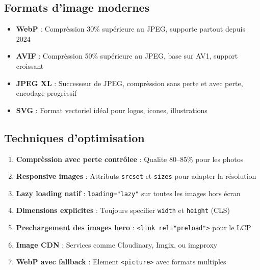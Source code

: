\subsection{Formats d'image modernes}

\begin{itemize}
    \item \textbf{WebP} : Comprèssion 30\% supérieure au JPEG, supporte partout depuis 2024
    \item \textbf{AVIF} : Comprèssion 50\% supérieure au JPEG, base sur AV1, support croissant
    \item \textbf{JPEG XL} : Successeur de JPEG, comprèssion sans perte et avec perte, encodage progrèssif
    \item \textbf{SVG} : Format vectoriel idéal pour logos, icones, illustrations
\end{itemize}

\subsection{Techniques d'optimisation}

\begin{enumerate}
    \item \textbf{Comprèssion avec perte contrôlee} : Qualite 80--85\% pour les photos
    \item \textbf{Responsive images} : Attributs \texttt{srcset} et \texttt{sizes} pour adapter la résolution
    \item \textbf{Lazy loading natif} : \texttt{loading="lazy"} sur toutes les images hors écran
    \item \textbf{Dimensions explicites} : Toujours specifier \texttt{width} et \texttt{height} (CLS)
    \item \textbf{Prechargement des images hero} : \texttt{<link rel="preload">} pour le LCP
    \item \textbf{Image CDN} : Services comme Cloudinary, Imgix, ou imgproxy
    \item \textbf{WebP avec fallback} : Element \texttt{<picture>} avec formats multiples
\end{enumerate}

